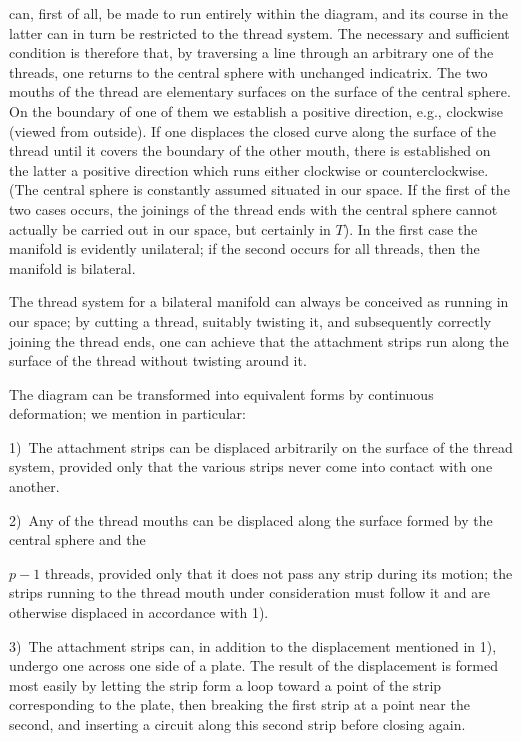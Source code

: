 \documentclass{article}
\begin{document}
can, first of all, be made to run entirely within the diagram, and its course in the latter can in turn be restricted to the thread system. The necessary and sufficient condition is therefore that, by traversing a line through an arbitrary one of the threads, one returns to the central sphere with unchanged indicatrix. The two mouths of the thread are elementary surfaces on the surface of the central sphere. On the boundary of one of them we establish a positive direction, e.g., clockwise (viewed from outside). If one displaces the closed curve along the surface of the thread until it covers the boundary of the other mouth, there is established on the latter a positive direction which runs either clockwise or counterclockwise. (The central sphere is constantly assumed situated in our space. If the first of the two cases occurs, the joinings of the thread ends with the central sphere cannot actually be carried out in our space, but certainly in $T$). In the first case the manifold is evidently unilateral; if the second occurs for all threads, then the manifold is bilateral.

The thread system for a bilateral manifold can always be conceived as running in our space; by cutting a thread, suitably twisting it, and subsequently correctly joining the thread ends, one can achieve that the attachment strips run along the surface of the thread without twisting around it.

The diagram can be transformed into equivalent forms by continuous deformation; we mention in particular:

1)~The attachment strips can be displaced arbitrarily on the surface of the thread system, provided only that the various strips never come into contact with one another.

2)~Any of the thread mouths can be displaced along the surface formed by the central sphere and the

$p - 1$ threads, provided only that it does not pass any strip during its motion; the strips running to the thread mouth under consideration must follow it and are otherwise displaced in accordance with 1).

3)~The attachment strips can, in addition to the displacement mentioned in 1), undergo one across one side of a plate. The result of the displacement is formed most easily by letting the strip form a loop toward a point of the strip corresponding to the plate, then breaking the first strip at a point near the second, and inserting a circuit along this second strip before closing again.
\end{document}
